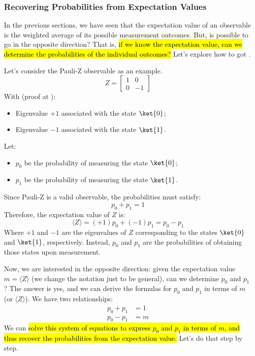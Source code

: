 \subsubsection{Recovering Probabilities from Expectation Values}

In the previous sections, we have seen that the expectation value of an observable is the weighted average of its possible measurement outcomes. But, is possible to go in the opposite direction? That is, \hl{if we know the expectation value, can we determine the probabilities of the individual outcomes?} Let's explore how to got .

\highspace
Let's consider the Pauli-Z observable as an example.
\begin{equation*}
    Z
    =
    \begin{bmatrix}
        1 & 0 \\
        0 & -1
    \end{bmatrix}
\end{equation*}
With (proof at ):
\begin{itemize}
    \item Eigenvalue $+1$ associated with the state $\ket{0}$;
    \item Eigenvalue $-1$ associated with the state $\ket{1}$.
\end{itemize}
Let:
\begin{itemize}
    \item $p_0$ be the probability of measuring the state $\ket{0}$;
    \item $p_1$ be the probability of measuring the state $\ket{1}$.
\end{itemize}
Since Pauli-Z is a valid observable, the probabilities must satisfy:
\begin{equation*}
    p_0 + p_1 = 1
\end{equation*}
Therefore, the expectation value of $Z$ is:
\begin{equation*}
    \langle Z \rangle
    =
    (+1)p_0
    +
    (-1)p_1
    =
    p_0 - p_1
\end{equation*}
Where $+1$ and $-1$ are the eigenvalues of $Z$ corresponding to the states $\ket{0}$ and $\ket{1}$, respectively. Instead, $p_0$ and $p_1$ are the probabilities of obtaining those states upon measurement.

\highspace
\textcolor{Green3}{} Now, we are interested in the opposite direction: given the expectation value $m = \langle Z \rangle$ (we change the notation just to be general), can we determine $p_0$ and $p_1$? The answer is yes, and we can derive the formulas for $p_0$ and $p_1$ in terms of $m$ (or $\langle Z \rangle$). We have two relationships:
\begin{align*}
    p_0 + p_1 &= 1 \\
    p_0 - p_1 &= m
\end{align*}
We can \hl{solve this system of equations to express $p_0$ and $p_1$ in terms of $m$, and thus recover the probabilities from the expectation value.} Let's do that step by step.

